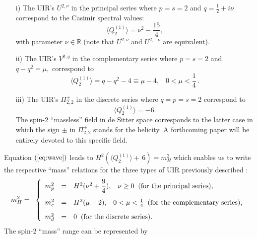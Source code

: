 \documentclass[a4paper,11pt,showpacs,preprintnumbers]{revtex4}
\def\setR{\mathbb{R}}
\begin{document}
\begin{itemize}
\item[i)] The UIR's $U^{2,\nu}$ in the principal series where
$p=s=2$ and $q=\frac{1}{2 }+i\nu$ correspond to the Casimir
spectral values:
\begin{equation}
\langle Q_2^{(1)}\rangle=\nu^2-\frac{15}{4},
\end{equation}
with parameter
$\nu \in \setR$ (note that $U^{2,\nu}$ and $U^{2,-\nu}$ are
equivalent).
\item[ ii)] The UIR's $V^{2,q}$ in the complementary series where
$p=s=2$ and $q-q^2=\mu,$ correspond to
\begin{equation}
\langle  Q_2^{(1)}\rangle=q-q^2-4\equiv \mu-4,\;\;\;0<\mu<\frac{1}{4}\,.
\end{equation}
\item[iii)] The UIR's $\Pi^{\pm}_{2,2}$ in the discrete series where
$q=p=s=2$ correspond to
\begin{equation}
\langle Q_2^{(1)}\rangle=-6 .
\end{equation}
The spin-2 ``massless'' field in de Sitter space corresponds to
the latter case in which the sign $\pm$ in $\Pi^{\pm}_{2,2}$
stands for the helicity. A forthcoming paper will be entirely
devoted to this specific field.
\end{itemize}
\noindent Equation $(\ref{eq:wave})$ leads to $H^2(\langle
Q_2^{(1)}\rangle+ \, 6)=m^2_H$ which enables us to write the
respective ``mass'' relations for the three types of UIR
previously described :
\begin{equation}m_{H}^{2}=\;\;
\left \{\begin{array}{rcllr} m^2_p&=&H^2(\nu^2+{\displaystyle
\frac{9}{4}}),\;\;\;\nu\geq 0\;\;\mbox{(for the
principal series),}\vspace{0.3cm} \\
m^2_c&=&H^2(\mu+2),\;\;\;0<\mu<\frac{1}{4}\;\;\mbox{(for the
complementary series),}\vspace{0.3cm} \\
m^2_d&=&0\;\;\mbox{(for the discrete series).}
\end{array}
\right.
\end{equation}
The  spin-$2$ ``mass'' range can be represented by \vspace{0.5cm}
\end{document}
